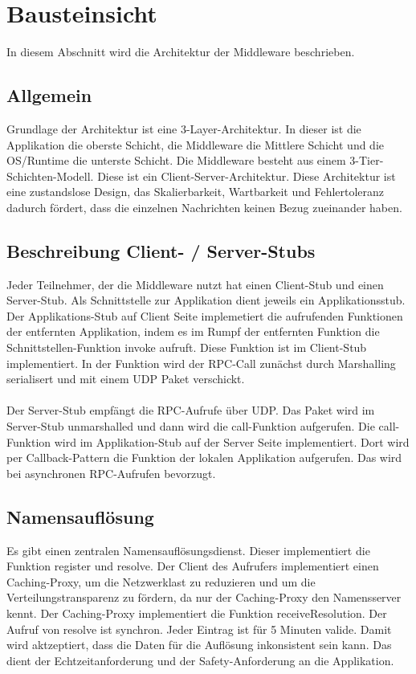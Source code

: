 \chapter{Bausteinsicht}
In diesem Abschnitt wird die Architektur der Middleware beschrieben.

\section{Allgemein}
Grundlage der Architektur ist eine 3-Layer-Architektur. In dieser ist die Applikation die oberste Schicht, die Middleware die Mittlere Schicht und die OS/Runtime die unterste Schicht. Die Middleware besteht aus einem 3-Tier-Schichten-Modell. Diese ist ein Client-Server-Architektur. Diese Architektur ist eine zustandslose Design, das Skalierbarkeit, Wartbarkeit und Fehlertoleranz dadurch  fördert, dass die einzelnen Nachrichten keinen Bezug zueinander haben.

\section{Beschreibung Client- / Server-Stubs}
Jeder Teilnehmer, der die Middleware nutzt hat einen Client-Stub und einen Server-Stub. Als Schnittstelle zur Applikation dient jeweils ein Applikationsstub. Der Applikations-Stub auf Client Seite implemetiert die aufrufenden Funktionen der entfernten Applikation, indem es im Rumpf der entfernten Funktion die Schnittstellen-Funktion \glqq{}invoke\grqq{} aufruft. Diese Funktion ist im Client-Stub implementiert. In der Funktion wird der RPC-Call zunächst durch Marshalling serialisert und mit einem UDP Paket verschickt.\\\\
Der Server-Stub empfängt die RPC-Aufrufe über UDP. Das Paket wird im Server-Stub unmarshalled und dann wird die \glqq{}call\grqq{}-Funktion aufgerufen. Die \glqq{}call\grqq{}-Funktion wird im Applikation-Stub auf der Server Seite implementiert. Dort wird per Callback-Pattern die Funktion der lokalen Applikation aufgerufen. Das wird bei asynchronen RPC-Aufrufen bevorzugt.

\section{Namensauflösung}
Es gibt einen zentralen Namensauflösungsdienst. Dieser implementiert die Funktion \glqq{}register\grqq{} und \glqq{}resolve\grqq{}. Der Client des Aufrufers implementiert einen Caching-Proxy, um die Netzwerklast zu reduzieren und um die Verteilungstransparenz zu fördern, da nur der Caching-Proxy den Namensserver kennt. Der Caching-Proxy implementiert die Funktion \glqq{}receiveResolution\grqq{}. Der Aufruf von \glqq{}resolve\grqq{} ist synchron. Jeder Eintrag ist für 5 Minuten valide. Damit wird aktzeptiert, dass die Daten für die Auflösung inkonsistent sein kann. Das dient der Echtzeitanforderung und der Safety-Anforderung an die Applikation.



